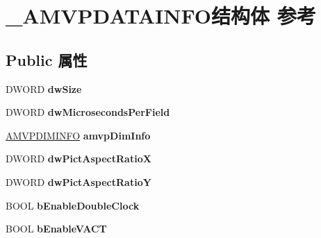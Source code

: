 \hypertarget{struct___a_m_v_p_d_a_t_a_i_n_f_o}{}\section{\+\_\+\+A\+M\+V\+P\+D\+A\+T\+A\+I\+N\+F\+O结构体 参考}
\label{struct___a_m_v_p_d_a_t_a_i_n_f_o}
\subsection*{Public 属性}
\begin{DoxyCompactItemize}
\item 
\mbox{\label{struct___a_m_v_p_d_a_t_a_i_n_f_o_abc8e7794090c246049e739c9727a9873}} 
D\+W\+O\+RD {\bfseries dw\+Size}
\item 
\mbox{\label{struct___a_m_v_p_d_a_t_a_i_n_f_o_ad2dc6af80eb49370e21d8ea9a9d4b30f}} 
D\+W\+O\+RD {\bfseries dw\+Microseconds\+Per\+Field}
\item 
\mbox{\label{struct___a_m_v_p_d_a_t_a_i_n_f_o_ac2ff2c752956c9cb09abfad30010d163}} 
\hyperlink{struct___a_m_v_p_d_i_m_i_n_f_o}{A\+M\+V\+P\+D\+I\+M\+I\+N\+FO} {\bfseries amvp\+Dim\+Info}
\item 
\mbox{\label{struct___a_m_v_p_d_a_t_a_i_n_f_o_a4a4d9f84b7c6fafea1b38726593b0878}} 
D\+W\+O\+RD {\bfseries dw\+Pict\+Aspect\+RatioX}
\item 
\mbox{\label{struct___a_m_v_p_d_a_t_a_i_n_f_o_a11e3872a1b36de582af0ea38dedf8b4a}} 
D\+W\+O\+RD {\bfseries dw\+Pict\+Aspect\+RatioY}
\item 
\mbox{\label{struct___a_m_v_p_d_a_t_a_i_n_f_o_ad3feb1b41718ff7074a78192e3c488ab}} 
B\+O\+OL {\bfseries b\+Enable\+Double\+Clock}
\item 
\mbox{\label{struct___a_m_v_p_d_a_t_a_i_n_f_o_a4fde4f081f48d4948d2ba568630a4257}} 
B\+O\+OL {\bfseries b\+Enable\+V\+A\+CT}
\item 
\mbox{\label{struct___a_m_v_p_d_a_t_a_i_n_f_o_a516ad6f6f558e20c3d3e3a8befeef76a}} 

\end{DoxyCompactItemize}
